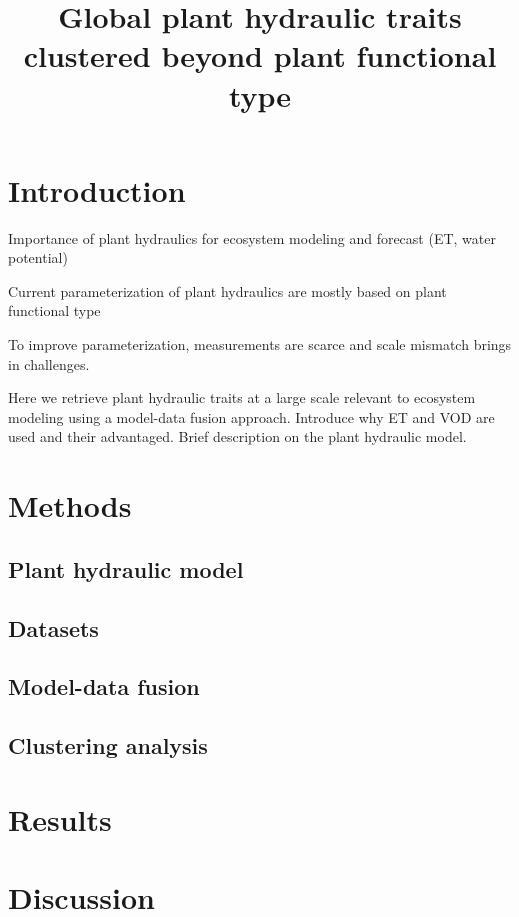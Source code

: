 \documentclass[11pt]{article}
\begin{document}
\title{Global plant hydraulic traits clustered beyond plant functional type}
\date{}

\maketitle{}
\section{Introduction}
Importance of plant hydraulics for ecosystem modeling and forecast (ET, water potential)

Current parameterization of plant hydraulics are mostly based on plant functional type


To improve parameterization, measurements are scarce and scale mismatch brings in challenges. 

Here we retrieve plant hydraulic traits at a large scale relevant to ecosystem modeling using a model-data fusion approach. Introduce why ET and VOD are used and their advantaged. Brief description on the plant hydraulic model. 

\section{Methods}
\subsection{Plant hydraulic model}

\subsection{Datasets}

\subsection{Model-data fusion}

\subsection{Clustering analysis}


\section{Results}


\section{Discussion}
\end{document}
